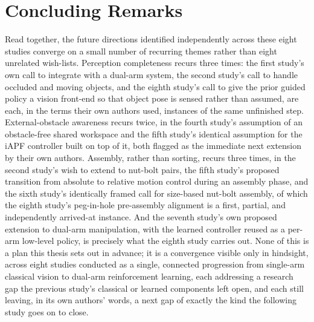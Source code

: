 \section{Concluding Remarks}\label{sec:concl_remarks}

Read together, the future directions identified independently across these eight studies converge
on a small number of recurring themes rather than eight unrelated wish-lists. Perception
completeness recurs three times: the first study's own call to integrate with a dual-arm system, the
second study's call to handle occluded and moving objects, and the eighth study's call to give the prior guided policy
a vision front-end so that object pose is sensed rather than assumed, are each, in the terms their
own authors used, instances of the same unfinished step. External-obstacle awareness recurs twice,
in the fourth study's assumption of an obstacle-free shared workspace and the fifth study's identical
assumption for the iAPF controller built on top of it, both flagged as the immediate next extension
by their own authors. Assembly, rather than sorting, recurs three times, in the second study's wish
to extend to nut-bolt pairs, the fifth study's proposed transition from absolute to relative motion
control during an assembly phase, and the sixth study's identically framed call for size-based
nut-bolt assembly, of which the eighth study's peg-in-hole pre-assembly alignment is a first,
partial, and independently arrived-at instance. And the seventh study's own proposed extension to
dual-arm manipulation, with the learned controller reused as a per-arm low-level policy, is precisely
what the eighth study carries out. None of this is a plan this thesis sets out in advance; it is a
convergence visible only in hindsight, across eight studies conducted as a single, connected
progression from single-arm classical vision to dual-arm reinforcement learning, each addressing a
research gap the previous study's classical or learned components left open, and each still leaving,
in its own authors' words, a next gap of exactly the kind the following study goes on to close.
